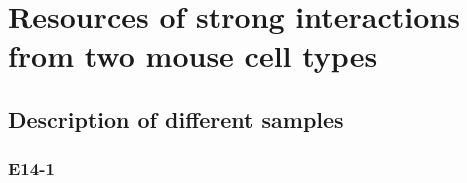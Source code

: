 \documentclass[letterpaper,10pt,english]{sphinxmanual}
\begin{document}
\chapter{Resources of strong interactions from two mouse cell types}
\label{Data_Resources:resource}\label{Data_Resources::doc}\label{Data_Resources:resources-of-strong-interactions-from-two-mouse-cell-types}

\section{Description of different samples}
\label{Data_Resources:description-of-different-samples}

\subsection{E14-1}
\end{document}
